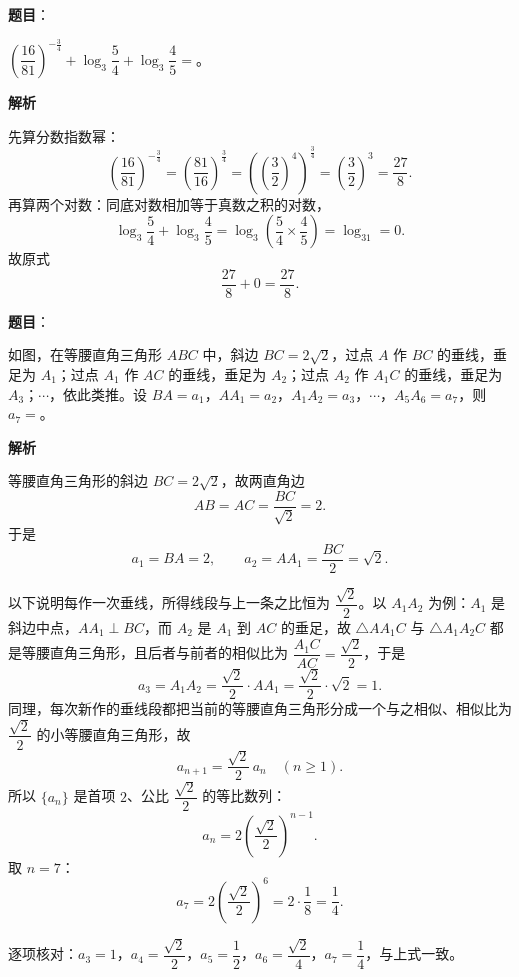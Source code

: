 \begin{answer}

\textbf{题目}：

$\left(\dfrac{16}{81}\right)^{-\frac34}+\log_3\dfrac54+\log_3\dfrac45=$\gkblank{}。

\textbf{解析}

先算分数指数幂：
\nopagebreak[4]
\[\left(\frac{16}{81}\right)^{-\frac34}=\left(\frac{81}{16}\right)^{\frac34}
=\left(\left(\frac32\right)^4\right)^{\frac34}=\left(\frac32\right)^3=\frac{27}8 .\]
再算两个对数：同底对数相加等于真数之积的对数，
\nopagebreak[4]
\[\log_3\frac54+\log_3\frac45=\log_3\left(\frac54\times\frac45\right)=\log_31=0 .\]
故原式
\nopagebreak[4]
\[\frac{27}8+0=\frac{27}8 .\]


\end{answer}
\begin{answer}

\textbf{题目}：

如图，在等腰直角三角形 $ABC$ 中，斜边 $BC=2\sqrt2$，过点 $A$ 作 $BC$ 的垂线，垂足为 $A_1$；过点 $A_1$ 作 $AC$ 的垂线，垂足为 $A_2$；过点 $A_2$ 作 $A_1C$ 的垂线，垂足为 $A_3$；$\cdots$，依此类推。设 $BA=a_1$，$AA_1=a_2$，$A_1A_2=a_3$，$\cdots$，$A_5A_6=a_7$，则 $a_7=$\gkblank{}。
\nopagebreak[4]
\begin{center}\end{center}
\nopagebreak[4]
\textbf{解析}

等腰直角三角形的斜边 $BC=2\sqrt2$，故两直角边
\nopagebreak[4]
\[AB=AC=\frac{BC}{\sqrt2}=2 .\]
于是
\nopagebreak[4]
\[a_1=BA=2,\qquad a_2=AA_1=\frac{BC}2=\sqrt2 .\]

以下说明每作一次垂线，所得线段与上一条之比恒为 $\dfrac{\sqrt2}2$。以 $A_1A_2$ 为例：$A_1$ 是斜边中点，$AA_1\perp BC$，而 $A_2$ 是 $A_1$ 到 $AC$ 的垂足，故 $\triangle AA_1C$ 与 $\triangle A_1A_2C$ 都是等腰直角三角形，且后者与前者的相似比为 $\dfrac{A_1C}{AC}=\dfrac{\sqrt2}{2}$，于是
\nopagebreak[4]
\[a_3=A_1A_2=\frac{\sqrt2}2\cdot AA_1=\frac{\sqrt2}2\cdot\sqrt2=1 .\]
同理，每次新作的垂线段都把当前的等腰直角三角形分成一个与之相似、相似比为 $\dfrac{\sqrt2}2$ 的小等腰直角三角形，故
\nopagebreak[4]
\[a_{n+1}=\frac{\sqrt2}2\,a_n\quad(n\geqslant1).\]
所以 $\{a_n\}$ 是首项 $2$、公比 $\dfrac{\sqrt2}2$ 的等比数列：
\nopagebreak[4]
\[a_n=2\left(\frac{\sqrt2}2\right)^{n-1}.\]
取 $n=7$：
\nopagebreak[4]
\[a_7=2\left(\frac{\sqrt2}2\right)^6=2\cdot\frac{1}{8}=\frac14 .\]

逐项核对：$a_3=1$，$a_4=\dfrac{\sqrt2}2$，$a_5=\dfrac12$，$a_6=\dfrac{\sqrt2}4$，$a_7=\dfrac14$，与上式一致。


\end{answer}
